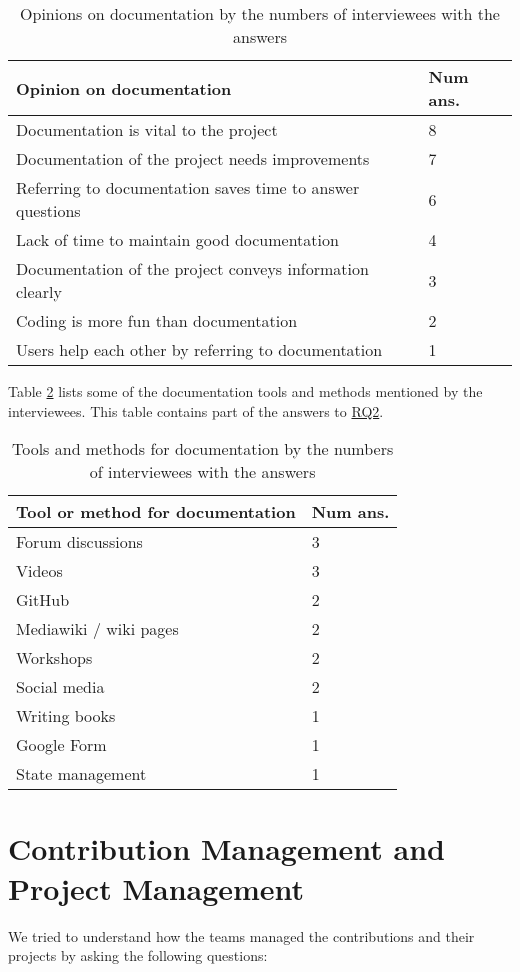 \begin{table}[H]
\centering
\begin{tabular}{ll}
\hline
Opinion on documentation & Num ans. \\ \hline
Documentation is vital to the project& 8 \\
Documentation of the project needs improvements & 7 \\
Referring to documentation saves time to answer questions & 6 \\
Lack of time to maintain good documentation & 4 \\
Documentation of the project conveys information clearly & 3 \\
Coding is more fun than documentation & 2 \\
Users help each other by referring to documentation & 1 \\ \hline
\end{tabular}
\caption{\label{tab_opinion_doc}Opinions on documentation by the numbers of interviewees with the answers}
\end{table}

Table \ref{tab_doc_tools} lists some of the documentation tools and methods mentioned by the interviewees. This table contains part of the answers to \hyperlink{rq2}{RQ2}.

\begin{table}[H]
\centering
\begin{tabular}{ll}
\hline
Tool or method for documentation & Num ans. \\ \hline
Forum discussions & 3 \\
Videos & 3 \\
GitHub & 2 \\
Mediawiki / wiki pages & 2 \\
Workshops & 2 \\
Social media & 2 \\
Writing books & 1 \\
Google Form & 1 \\
State management & 1 \\ \hline
\end{tabular}
\caption{\label{tab_doc_tools}Tools and methods for documentation by the numbers of interviewees with the answers}
\end{table}

\section{Contribution Management and Project Management}
\label{sec_contribution_pm}
We tried to understand how the teams managed the contributions and their projects by asking the following questions:

